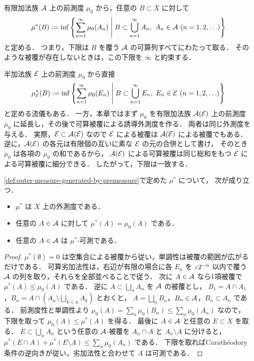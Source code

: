 \begin{definition}[誘導外測度]\label{def:outer-measure-generated-by-premeasure}
有限加法族 $\mathcal A$ 上の前測度 $\mu_0$ から，任意の $B\subset X$ に対して
\[
\mu^*(B)
:=
\inf\left\{
\sum_{n=1}^{\infty}\mu_0(A_n)
\;\middle|\;
B\subset\bigcup_{n=1}^{\infty}A_n,\ A_n\in\mathcal A\ (n=1,2,\ldots)
\right\}
\]
と定める．
つまり，下限は $B$ を覆う $\mathcal A$ の可算列すべてにわたって取る．
そのような被覆が存在しないときは，この下限を $\infty$ と約束する．
\end{definition}

\begin{remark}[半加法族から直接作る流儀]\label{rem:outer-measure-from-semiring-directly}
半加法族 $\mathcal E$ 上の前測度 $\mu_0$ から直接
\[
\mu^*_{\mathcal E}(B)
:=
\inf\left\{
\sum_{n=1}^{\infty}\mu_0(E_n)
\;\middle|\;
B\subset\bigcup_{n=1}^{\infty}E_n,\ E_n\in\mathcal E\ (n=1,2,\ldots)
\right\}
\]
と定める流儀もある．
一方，本章ではまず $\mu_0$ を有限加法族 $\mathcal A(\mathcal E)$ 上の前測度
$\overline\mu_0$ に延長し，その後で可算被覆による誘導外測度を作る．
両者は同じ外測度を与える．
実際，$\mathcal E\subset\mathcal A(\mathcal E)$ なので $\mathcal E$ による被覆は
$\mathcal A(\mathcal E)$ による被覆でもある．
逆に，$\mathcal A(\mathcal E)$ の各元は有限個の互いに素な $\mathcal E$ の元の合併として書け，
そのとき $\overline\mu_0$ は各項の $\mu_0$ の和であるから，
$\mathcal A(\mathcal E)$ による可算被覆は同じ総和をもつ $\mathcal E$ による可算被覆に細分できる．
したがって，下限は一致する．
\end{remark}

\begin{theorem}[誘導外測度]\label{thm:outer-measure-from-premeasure}
\cref{def:outer-measure-generated-by-premeasure}で定めた $\mu^*$ について，
次が成り立つ．
\begin{itemize}
    \item $\mu^*$ は $X$ 上の外測度である．
    \item 任意の $A\in\mathcal A$ に対して $\mu^*(A)=\mu_0(A)$ である．
    \item 任意の $A\in\mathcal A$ は $\mu^*$-可測である．
\end{itemize}
\end{theorem}
\begin{proof}
$\mu^*(\emptyset)=0$ は空集合による被覆から従い，単調性は被覆の範囲が広がるだけである．
可算劣加法性は，右辺が有限の場合に各 $E_n$ を $\varepsilon 2^{-n}$ 以内で覆う
$\mathcal A$ の列を取り，それらを全部並べることで従う．
次に $A\in\mathcal A$ なら1項被覆で $\mu^*(A)\le\mu_0(A)$ である．
逆に $A\subset\bigcup_n A_n$ を $\mathcal A$ の被覆とし，
$B_1=A\cap A_1$，$B_n=A\cap(A_n\setminus\bigcup_{k<n}A_k)$ とおくと，
$A=\bigsqcup_n B_n$，$B_n\in\mathcal A$，$B_n\subset A_n$ である．
前測度性と単調性より $\mu_0(A)=\sum_n\mu_0(B_n)\le\sum_n\mu_0(A_n)$ なので，
下限を取って $\mu_0(A)\le\mu^*(A)$ を得る．
最後に $A\in\mathcal A$ と任意の $E\subset X$ を取る．
$E\subset\bigcup_n A_n$ という任意の $\mathcal A$-被覆を
$A_n\cap A$ と $A_n\setminus A$ に分けると，
$\mu^*(E\cap A)+\mu^*(E\setminus A)\le\sum_n\mu_0(A_n)$ である．
下限を取ればCarathéodory条件の逆向きが従い，劣加法性と合わせて $A$ は可測である．
\end{proof}

